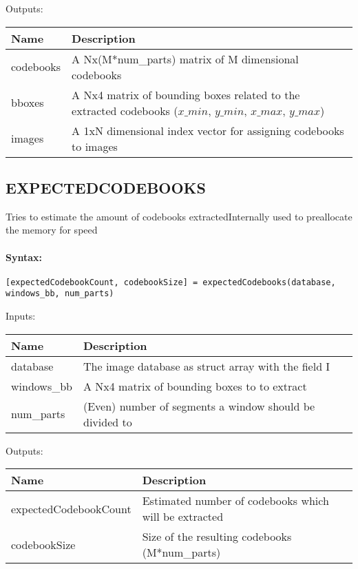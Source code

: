 \bigskip
Outputs:

\begin{tabular}{|p{}|p{}|}
\hline
\textbf{Name} & \textbf{Description} \\
\hline \hline
codebooks & A Nx(M*num\_parts) matrix of M dimensional codebooks  \\ \hline
bboxes & A Nx4 matrix of bounding boxes related to the extracted codebooks ($x\_{min}$, $y\_{min}$, $x\_{max}$, $y\_{max}$)  \\ \hline
images & A 1xN dimensional index vector for assigning codebooks to images  \\ \hline
\end{tabular}

\subsection{EXPECTEDCODEBOOKS}

Tries to estimate the amount of codebooks extractedInternally used to preallocate the memory for speed

\paragraph{Syntax:} \verb|[expectedCodebookCount, codebookSize] = expectedCodebooks(database, windows_bb, num_parts)|

\bigskip
Inputs:

\begin{tabular}{|p{}|p{}|}
\hline
\textbf{Name} & \textbf{Description} \\
\hline \hline
database & The image database as struct array with the field I  \\ \hline
windows\_bb & A Nx4 matrix of bounding boxes to to extract  \\ \hline
num\_parts & (Even) number of segments a window should be divided to  \\ \hline
\end{tabular}

\bigskip
Outputs:

\begin{tabular}{|p{}|p{}|}
\hline
\textbf{Name} & \textbf{Description} \\
\hline \hline
expectedCodebookCount & Estimated number of codebooks which will be extracted  \\ \hline
codebookSize & Size of the resulting codebooks (M*num\_parts)  \\ \hline
\end{tabular}

